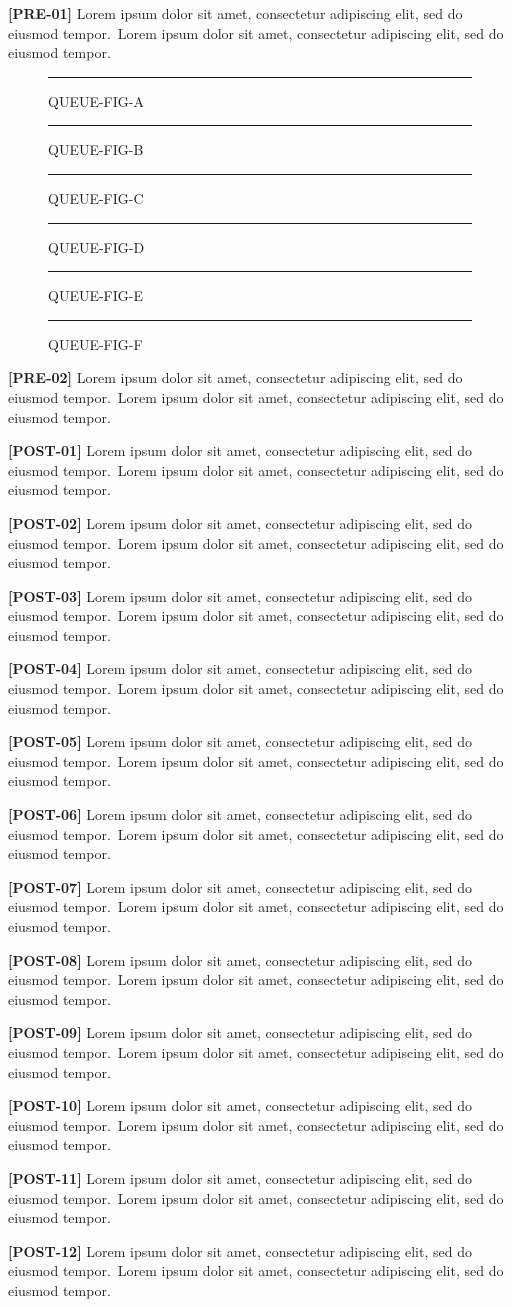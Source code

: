 \documentclass[twocolumn]{article}
\newcommand\Body{Lorem ipsum dolor sit amet, consectetur adipiscing elit, sed do eiusmod tempor.}
\newcommand\Par[1]{\par\textbf{[#1]} \Body\ \Body\par\medskip}
\newcommand\Fig[1]{\begin{figure}[t]\centering\rule{3cm}{.38\textheight}\caption{#1}\end{figure}}
\begin{document}
\Par{PRE-01}\Fig{QUEUE-FIG-A}\Fig{QUEUE-FIG-B}\Fig{QUEUE-FIG-C}
\Fig{QUEUE-FIG-D}\Fig{QUEUE-FIG-E}\Fig{QUEUE-FIG-F}\Par{PRE-02}
\begin{wideband}[rules=none]
  \centering{}
\end{wideband}
\Par{POST-01}\Par{POST-02}\Par{POST-03}\Par{POST-04}\Par{POST-05}\Par{POST-06}
\Par{POST-07}\Par{POST-08}\Par{POST-09}\Par{POST-10}\Par{POST-11}\Par{POST-12}
\end{document}
